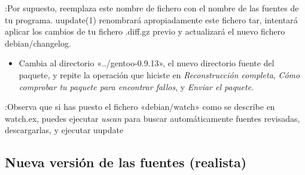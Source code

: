 \documentclass[letterpaper,12pt,spanish]{manual}
\begin{document}
:Por supuesto, reemplaza este nombre de fichero con el nombre de las fuentes de tu programa. uupdate(1) renombrará apropiadamente este fichero tar, intentará aplicar los cambios de tu fichero .diff.gz previo y actualizará el nuevo fichero debian/changelog.
\begin{itemize}
\item {} 
Cambia al directorio «../gentoo-0.9.13», el nuevo directorio fuente del paquete, y repite la operación que hiciste en \emph{Reconstrucción completa}, \emph{Cómo comprobar tu paquete para encontrar fallos}, y \emph{Enviar el paquete}.

\end{itemize}

:Observa que si has puesto el fichero «debian/watch» como se describe en watch.ex, puedes ejecutar \emph{uscan} para buscar automáticamente fuentes revisadas, descargarlas, y ejecutar uupdate


\subsection{Nueva versión de las fuentes (realista)}
\end{document}
